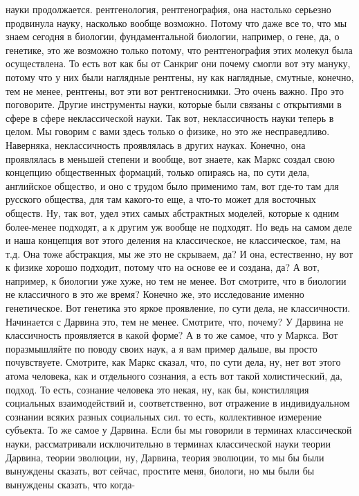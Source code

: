 науки продолжается. рентгенология, рентгенография, она настолько серьезно
продвинула науку, насколько вообще возможно. Потому что даже все то, что мы
знаем сегодня в биологии, фундаментальной биологии, например, о гене, да, о
генетике, это же возможно только потому, что рентгенография этих молекул была
осуществлена. То есть вот как бы от Санкриг они почему смогли вот эту мануку,
потому что у них были наглядные рентгены, ну как наглядные, смутные, конечно,
тем не менее, рентгены, вот эти вот рентгеноснимки. Это очень важно. Про это
поговорите. Другие инструменты науки, которые были связаны с открытиями в сфере
в сфере неклассической науки. Так вот, неклассичность науки теперь в целом. Мы
говорим с вами здесь только о физике, но это же несправедливо. Наверняка,
неклассичность проявлялась в других науках. Конечно, она проявлялась в меньшей
степени и вообще, вот знаете, как Маркс создал свою концепцию общественных
формаций, только опираясь на, по сути дела, английское общество, и оно с трудом
было применимо там, вот где-то там для русского общества, для там какого-то еще,
а что-то может для восточных обществ. Ну, так вот, удел этих самых абстрактных
моделей, которые к одним более-менее подходят, а к другим уж вообще не подходят.
Но ведь на самом деле и наша концепция вот этого деления на классическое, не
классическое, там, на т.д. Она тоже абстракция, мы же это не скрываем, да? И
она, естественно, ну вот к физике хорошо подходит, потому что на основе ее и
создана, да? А вот, например, к биологии уже хуже, но тем не менее. Вот
смотрите, что в биологии не классичного в это же время? Конечно же, это
исследование именно генетическое. Вот генетика это яркое проявление, по сути
дела, не классичности. Начинается с Дарвина это, тем не менее. Смотрите, что,
почему? У Дарвина не классичность проявляется в какой форме? А в то же самое,
что у Маркса. Вот поразмышляйте по поводу своих наук, а я вам пример дальше, вы
просто почувствуете. Смотрите, как Маркс сказал, что, по сути дела, ну, нет вот
этого атома человека, как и отдельного сознания, а есть вот такой холистический,
да, подход. То есть, сознание человека это некая, ну, как бы, констилляция
социальных взаимодействий и, соответственно, вот отражение в индивидуальном
сознании всяких разных социальных сил. то есть, коллективное измерение субъекта.
То же самое у Дарвина. Если бы мы говорили в терминах классической науки,
рассматривали исключительно в терминах классической науки теории Дарвина, теории
эволюции, ну, Дарвина, теория эволюции, то мы бы были вынуждены сказать, вот
сейчас, простите меня, биологи, но мы были бы вынуждены сказать, что когда-

